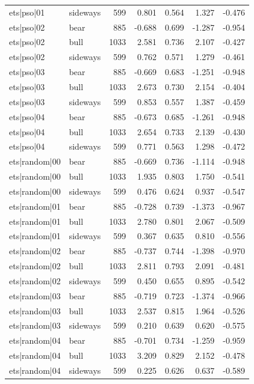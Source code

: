 \begin{table}
\begin{tabular}{llrrrrr}
ets|pso|01 & sideways & 599 & 0.801 & 0.564 & 1.327 & -0.476 \\
ets|pso|02 & bear & 885 & -0.688 & 0.699 & -1.287 & -0.954 \\
ets|pso|02 & bull & 1033 & 2.581 & 0.736 & 2.107 & -0.427 \\
ets|pso|02 & sideways & 599 & 0.762 & 0.571 & 1.279 & -0.461 \\
ets|pso|03 & bear & 885 & -0.669 & 0.683 & -1.251 & -0.948 \\
ets|pso|03 & bull & 1033 & 2.673 & 0.730 & 2.154 & -0.404 \\
ets|pso|03 & sideways & 599 & 0.853 & 0.557 & 1.387 & -0.459 \\
ets|pso|04 & bear & 885 & -0.673 & 0.685 & -1.261 & -0.948 \\
ets|pso|04 & bull & 1033 & 2.654 & 0.733 & 2.139 & -0.430 \\
ets|pso|04 & sideways & 599 & 0.771 & 0.563 & 1.298 & -0.472 \\
ets|random|00 & bear & 885 & -0.669 & 0.736 & -1.114 & -0.948 \\
ets|random|00 & bull & 1033 & 1.935 & 0.803 & 1.750 & -0.541 \\
ets|random|00 & sideways & 599 & 0.476 & 0.624 & 0.937 & -0.547 \\
ets|random|01 & bear & 885 & -0.728 & 0.739 & -1.373 & -0.967 \\
ets|random|01 & bull & 1033 & 2.780 & 0.801 & 2.067 & -0.509 \\
ets|random|01 & sideways & 599 & 0.367 & 0.635 & 0.810 & -0.556 \\
ets|random|02 & bear & 885 & -0.737 & 0.744 & -1.398 & -0.970 \\
ets|random|02 & bull & 1033 & 2.811 & 0.793 & 2.091 & -0.481 \\
ets|random|02 & sideways & 599 & 0.450 & 0.655 & 0.895 & -0.542 \\
ets|random|03 & bear & 885 & -0.719 & 0.723 & -1.374 & -0.966 \\
ets|random|03 & bull & 1033 & 2.537 & 0.815 & 1.964 & -0.526 \\
ets|random|03 & sideways & 599 & 0.210 & 0.639 & 0.620 & -0.575 \\
ets|random|04 & bear & 885 & -0.701 & 0.734 & -1.259 & -0.959 \\
ets|random|04 & bull & 1033 & 3.209 & 0.829 & 2.152 & -0.478 \\
ets|random|04 & sideways & 599 & 0.225 & 0.626 & 0.637 & -0.589 \\

\end{tabular}
\end{table}
